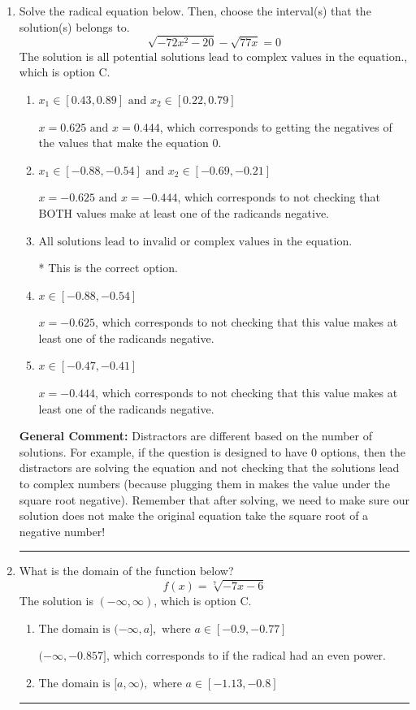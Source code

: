 \documentclass{extbook}[14pt]
\newcommand{\litem}[1]{\item #1

\rule{\textwidth}{0.4pt}}
\begin{document}
\begin{enumerate}\litem{
Solve the radical equation below. Then, choose the interval(s) that the solution(s) belongs to.
\[ \sqrt{-72 x^2 - 20} - \sqrt{77 x} = 0 \]The solution is \( \text{all potential solutions lead to complex values in the equation.} \), which is option C.\begin{enumerate}[label=\Alph*.]
\item \( x_1 \in [0.43, 0.89] \text{ and } x_2 \in [0.22,0.79] \)

$x = 0.625 \text{ and } x = 0.444$, which corresponds to getting the negatives of the values that make the equation 0.
\item \( x_1 \in [-0.88, -0.54] \text{ and } x_2 \in [-0.69,-0.21] \)

$x = -0.625 \text{ and } x = -0.444$, which corresponds to not checking that BOTH values make at least one of the radicands negative.
\item \( \text{All solutions lead to invalid or complex values in the equation.} \)

* This is the correct option.
\item \( x \in [-0.88,-0.54] \)

$x = -0.625$, which corresponds to not checking that this value makes at least one of the radicands negative.
\item \( x \in [-0.47,-0.41] \)

$x = -0.444$, which corresponds to not checking that this value makes at least one of the radicands negative.
\end{enumerate}

\textbf{General Comment:} Distractors are different based on the number of solutions. For example, if the question is designed to have 0 options, then the distractors are solving the equation and not checking that the solutions lead to complex numbers (because plugging them in makes the value under the square root negative). Remember that after solving, we need to make sure our solution does not make the original equation take the square root of a negative number!
}
\litem{
What is the domain of the function below?
\[ f(x) = \sqrt[7]{-7 x - 6} \]The solution is \( (-\infty, \infty) \), which is option C.\begin{enumerate}[label=\Alph*.]
\item \( \text{The domain is } (-\infty, a], \text{   where } a \in [-0.9, -0.77] \)

$(-\infty, -0.857]$, which corresponds to if the radical had an even power.
\item \( \text{The domain is } [a, \infty), \text{   where } a \in [-1.13, -0.8] \)


\end{enumerate}}
\end{enumerate}
\end{document}
